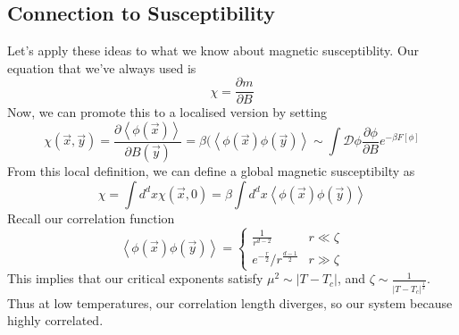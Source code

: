 \subsection{Connection to Susceptibility} 
Let's apply these ideas to what we know about magnetic susceptiblity. 
Our equation that we've always used is 
\[
 \chi = \frac{\partial  m}{\partial   B } 
\] Now, we can promote this to a localised 
version by setting 
\[
	\chi ( \vec{x}, \vec{y} ) = \frac{\partial  \left< \phi ( \vec{x} )  \right> }{\partial B ( \vec{y} ) } = \beta ( \left< \phi ( \vec{x} ) \phi ( \vec{y} )  \right> \sim \int \mathcal{ D } \phi \frac{\partial \phi }{\partial  B } e^{  - \beta F [ \phi ] }  
\] From this local 
definition, we can define a global magnetic 
susceptibilty as 
\[
	\chi = \int d^ d x \chi ( \vec{x}, 0 ) = \beta \int d^ d x \left< \phi ( \vec{x} ) \phi ( \vec{y} )  \right>
\]
Recall our correlation function 
\[
	\left< \phi ( \vec{x} ) \phi ( \vec{y} )  \right> = \begin{cases}
		\frac{1}{r^{ d - 2}  } & r \ll \zeta \\
		e^{ - \frac{r}{2 } } / r ^{ \frac{ d -1 }{ 2 } } & r \gg \zeta
	\end{cases}
\] This implies that our critical exponents satisfy $ \mu ^ 2 \sim | T - T_{ c } | $, 
and $ \zeta \sim \frac{1}{ | T - T_{ c } | ^{ \frac{1}{ 2 }  } } $. 
Thus at low temperatures, our correlation length diverges, so 
our system because highly correlated. 

